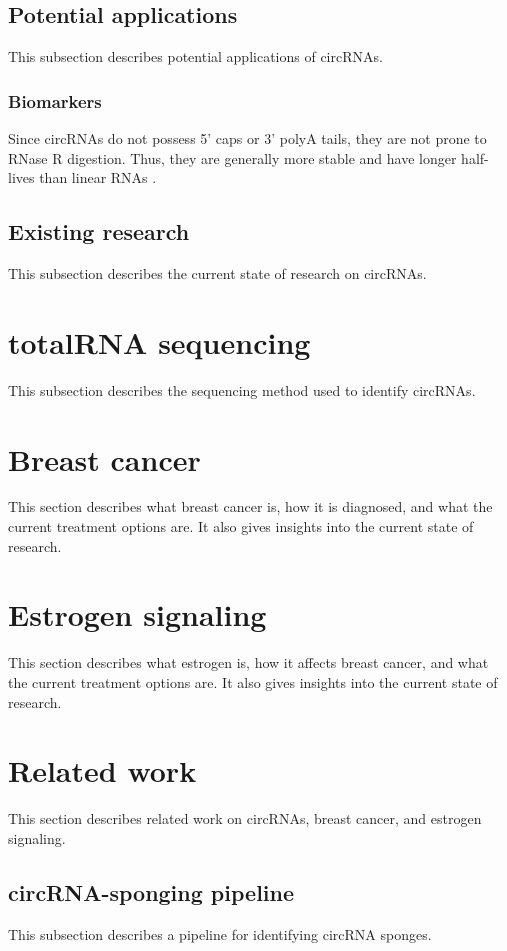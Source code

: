 \subsection{Potential applications}
This subsection describes potential applications of circRNAs.

\subsubsection{Biomarkers}
Since circRNAs do not possess 5' caps or 3' polyA tails, they are not prone to
RNase R digestion. Thus, they are generally more stable and have longer
half-lives than linear RNAs \supercite{kristensen_biogenesis_2019}.

\subsection{Existing research}
This subsection describes the current state of research on circRNAs.

\section{totalRNA sequencing}
This subsection describes the sequencing method used to identify circRNAs.

\lipsum[2]

\section{Breast cancer}
This section describes what breast cancer is, how it is diagnosed, and what the
current treatment options are. It also gives insights into the current state of
research.

\lipsum[3]

\section{Estrogen signaling}
This section describes what estrogen is, how it affects breast cancer, and what
the current treatment options are. It also gives insights into the current state
of research.

\lipsum[4]

\section{Related work}
This section describes related work on circRNAs, breast cancer, and estrogen
signaling.

\subsection{circRNA-sponging pipeline}
This subsection describes a pipeline for identifying circRNA sponges.
